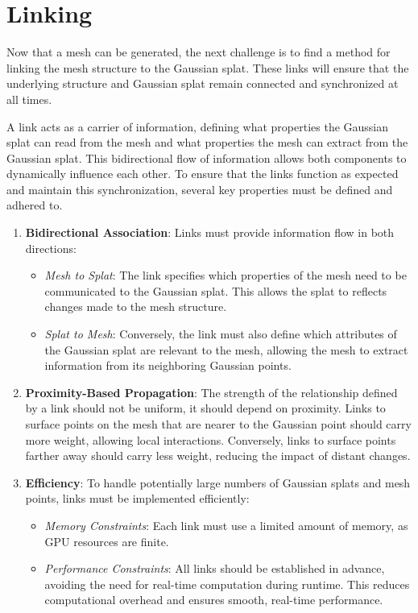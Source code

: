 \chapter{Linking}

\label{linking}

Now that a mesh can be generated, the next challenge is to find a method for linking the mesh structure to the Gaussian splat. These links will ensure that the underlying structure and Gaussian splat remain connected and synchronized at all times. 

A link acts as a carrier of information, defining what properties the Gaussian splat can read from the mesh and what properties the mesh can extract from the Gaussian splat. This bidirectional flow of information allows both components to dynamically influence each other. To ensure that the links function as expected and maintain this synchronization, several key properties must be defined and adhered to.

\begin{enumerate}
    \item \textbf{Bidirectional Association}:  
    Links must provide information flow in both directions:  
    \begin{itemize}
        \item \textit{Mesh to Splat}: The link specifies which properties of the mesh need to be communicated to the Gaussian splat. This allows the splat to reflects changes made to the mesh structure.  
        \item \textit{Splat to Mesh}: Conversely, the link must also define which attributes of the Gaussian splat are relevant to the mesh, allowing the mesh to extract information from its neighboring Gaussian points.  
    \end{itemize}

    \item \textbf{Proximity-Based Propagation}:  
    The strength of the relationship defined by a link should not be uniform, it should depend on proximity. Links to surface points on the mesh that are nearer to the Gaussian point should carry more weight, allowing local interactions. Conversely, links to surface points farther away should carry less weight, reducing the impact of distant changes.  

    \item \textbf{Efficiency}:  
    To handle potentially large numbers of Gaussian splats and mesh points, links must be implemented efficiently:  
    \begin{itemize}
        \item \textit{Memory Constraints}: Each link must use a limited amount of memory, as GPU resources are finite.  
        \item \textit{Performance Constraints}: All links should be established in advance, avoiding the need for real-time computation during runtime. This reduces computational overhead and ensures smooth, real-time performance.
    \end{itemize}
\end{enumerate}


